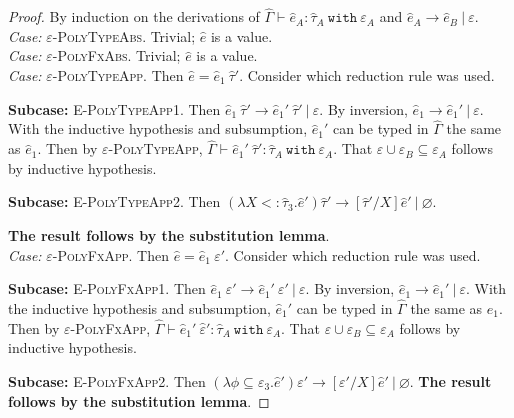 \documentclass{llncs}
\newcommand{\keywadj}[1]{\mathtt{#1}}
\newcommand{\keyw}[1]{\keywadj{#1}~}
\newcommand{\kw}[1]{\keyw{ #1 }}
\begin{document}
\begin{proof} By induction on the derivations of $\hat \Gamma \vdash \hat e_A: \hat \tau_A~\kw{with} \varepsilon_A$ and $\hat e_A \longrightarrow \hat e_B~|~\varepsilon$.\\

\textit{Case:} \textsc{$\varepsilon$-PolyTypeAbs}. Trivial; $\hat e$ is a value.\\

\textit{Case:} \textsc{$\varepsilon$-PolyFxAbs}. Trivial; $\hat e$ is a value.\\

\textit{Case:} \textsc{$\varepsilon$-PolyTypeApp}. Then $\hat e = \hat e_1~\hat \tau'$. Consider which reduction rule was used.

\textbf{Subcase:} \textsc{E-PolyTypeApp1}. Then $\hat e_1~\hat \tau' \longrightarrow \hat e_1'~\hat \tau'~|~\varepsilon$. By inversion, $\hat e_1 \longrightarrow \hat e_1'~|~\varepsilon$. With the inductive hypothesis and subsumption, $\hat e_1'$ can be typed in $\hat \Gamma$ the same as $\hat e_1$. Then by \textsc{$\varepsilon$-PolyTypeApp}, $\hat \Gamma \vdash \hat e_1'~\hat \tau': \hat \tau_A~\kw{with} \varepsilon_A$. That $\varepsilon \cup \varepsilon_B \subseteq \varepsilon_A$ follows by inductive hypothesis.

\textbf{Subcase:} \textsc{E-PolyTypeApp2}. Then $(\lambda X <: \hat \tau_3. \hat e') \hat \tau' \longrightarrow [\hat \tau'/X]\hat e'~|~\varnothing$.

 \textbf{The result follows by the substitution lemma}.\\

\textit{Case:} \textsc{$\varepsilon$-PolyFxApp}. Then $\hat e = \hat e_1~\varepsilon'$. Consider which reduction rule was used.

\textbf{Subcase:} \textsc{E-PolyFxApp1}. Then $\hat e_1~\varepsilon' \longrightarrow \hat e_1'~\varepsilon'~|~\varepsilon$. By inversion, $\hat e_1 \longrightarrow \hat e_1'~|~\varepsilon$. With the inductive hypothesis and subsumption, $\hat e_1'$ can be typed in $\hat \Gamma$ the same as $\hat e_1$. Then by \textsc{$\varepsilon$-PolyFxApp}, $\hat \Gamma \vdash \hat e_1'~\hat \varepsilon': \hat \tau_A~\kw{with} \varepsilon_A$. That $\varepsilon \cup \varepsilon_B \subseteq \varepsilon_A$ follows by inductive hypothesis.

\textbf{Subcase:} \textsc{E-PolyFxApp2}. Then $(\lambda \phi \subseteq \varepsilon_3.\hat e') \varepsilon' \longrightarrow [\varepsilon'/X]\hat e'~|~\varnothing$. \textbf{The result follows by the substitution lemma}.


\end{proof}
\end{document}
